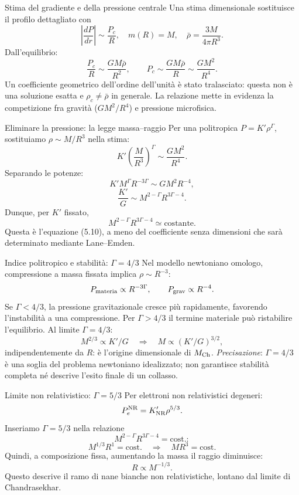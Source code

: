 \begin{frame}[t]{Stima del gradiente e della pressione centrale}
\small
Una stima dimensionale sostituisce il profilo dettagliato con
\[
\left|\frac{dP}{dr}\right|\sim\frac{P_c}{R},\quad
m(R)=M,\quad \bar\rho=\frac{3M}{4\pi R^3}.
\]
Dall'equilibrio:
\[
\frac{P_c}{R}\sim\frac{GM\bar\rho}{R^2},\qquad
P_c\sim\frac{GM\bar\rho}{R}\sim\frac{GM^2}{R^4}.
\]
Un coefficiente geometrico dell'ordine dell'unità è stato tralasciato: questa non è una soluzione esatta e $\rho_c\neq\bar\rho$ in generale.
\medskip
La relazione mette in evidenza la competizione fra gravità ($GM^2/R^4$) e pressione microfisica.
\end{frame}

\begin{frame}[t]{Eliminare la pressione: la legge massa--raggio}
\small
Per una politropica $P=K'\rho^\Gamma$, sostituiamo $\rho\sim M/R^3$ nella stima:
\[
K'\left(\frac{M}{R^3}\right)^\Gamma\sim \frac{GM^2}{R^4}.
\]
Separando le potenze:
\[
K' M^\Gamma R^{-3\Gamma}\sim GM^2R^{-4},
\]
\[
\frac{K'}G\sim M^{2-\Gamma}R^{3\Gamma-4}.
\]
Dunque, per $K'$ fissato,
\[
M^{2-\Gamma}R^{3\Gamma-4}\simeq\mathrm{costante}.
\]
Questa è l'equazione (5.10), a meno del coefficiente senza dimensioni che sarà determinato mediante Lane--Emden.
\end{frame}

\begin{frame}[t]{Indice politropico e stabilità: $\Gamma=4/3$}
\small
Nel modello newtoniano omologo, compressione a massa fissata implica $\rho\sim R^{-3}$:
\[
P_{\rm materia}\propto R^{-3\Gamma},\qquad
P_{\rm grav}\propto R^{-4}.
\]
Se $\Gamma<4/3$, la pressione gravitazionale cresce più rapidamente, favorendo l'instabilità a una compressione. Per $\Gamma>4/3$ il termine materiale può ristabilire l'equilibrio.
\medskip
Al limite $\Gamma=4/3$:
\[
M^{2/3}\propto K'/G\quad\Longrightarrow\quad
M\propto(K'/G)^{3/2},
\]
indipendentemente da $R$: è l'origine dimensionale di $M_{\rm Ch}$.
\medskip
\emph{Precisazione}: $\Gamma=4/3$ è una soglia del problema newtoniano idealizzato; non garantisce stabilità completa né descrive l'esito finale di un collasso.
\end{frame}

\begin{frame}[t]{Limite non relativistico: $\Gamma=5/3$}
\small
Per elettroni non relativistici degeneri:
\[
P_e^{\rm NR}=K'_{\rm NR}\rho^{5/3}.
\]
Inseriamo $\Gamma=5/3$ nella relazione
\[
M^{2-\Gamma}R^{3\Gamma-4}=\mathrm{cost.}:
\]
\[
M^{1/3}R^1=\mathrm{cost.}\quad\Longrightarrow\quad
MR^3=\mathrm{cost.}
\]
Quindi, a composizione fissa, aumentando la massa il raggio diminuisce:
\[
R\propto M^{-1/3}.
\]
Questo descrive il ramo di nane bianche non relativistiche, lontano dal limite di Chandrasekhar.
\end{frame}

